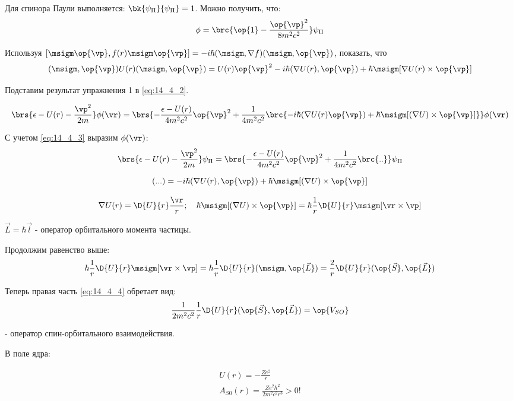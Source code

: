 Для спинора Паули выполняется: $\bk{\psi_\Pi}{\psi_\Pi} = 1$. Можно получить, что:
\begin{equation}
\label{eq:14_4_3}
\phi = \brc{\op{1} - \frac{\op{\vp}^2}{8m^2c^2}} \psi_\Pi
\end{equation}

\begin{excr}
Используя $[\msigm \op{\vp}, f(r) \msigm \op{\vp}] = -i\hbar (\msigm, \nabla f)(\msigm, \op{\vp})$, показать, что
$$
(\msigm, \op{\vp}) U(r) (\msigm, \op{\vp}) = U(r) \op{\vp}^2 - i \hbar (\nabla U(r), \op{\vp}) + \hbar \msigm [\nabla U(r) \times \op{\vp}]
$$
\end{excr}

Подставим результат упражнения 1 в \eqref{eq:14_4_2}.

$$
\brs{\epsilon - U(r) - \frac{{\vp}^2}{2m}}\phi(\vr) = \brs{- \frac{\epsilon - U(r)}{4m^2c^2}\op{\vp}^2 + \frac{1}{4m^2 c^2} \brc{-i\hbar (\nabla U(r) \op{\vp}) + \hbar \msigm [(\nabla U) \times \op{\vp}]}} \phi(\vr)
$$

С учетом \eqref{eq:14_4_3} выразим $\phi(\vr)$:
$$
\brs{\epsilon - U(r) - \frac{{\vp}^2}{2m}}\psi_\Pi = \brs{- \frac{\epsilon - U(r)}{4m^2c^2}\op{\vp}^2 + \frac{1}{4m^2 c^2} \brc{..}} \psi_\Pi
$$

\begin{equation}
\label{eq:14_4_4}
(...) = -i\hbar (\nabla U(r), \op{\vp}) + \hbar \msigm [(\nabla U) \times \op{\vp}]
\end{equation}

$$
\nabla U(r) = \D{U}{r} \frac{\vr}{r};~~~
\hbar \msigm [(\nabla U) \times \op{\vp}] = \hbar \frac{1}{r} \D{U}{r} \msigm [\vr \times \vp] 
$$

$\vec{L} = \hbar \vec{l}$ - оператор орбитального момента частицы.

Продолжим равенство выше:
$$
\hbar \frac{1}{r} \D{U}{r} \msigm [\vr \times \vp] = {\hbar} \frac{1}{r} \D{U}{r} (\msigm, \op{\vec{L}}) = \frac{2}{r} \D{U}{r} (\op{\vec{S}}, \op{\vec{L}})
$$

Теперь правая часть \eqref{eq:14_4_4} обретает вид: 
$$\frac{1}{2m^2c^2}\frac{1}{r} \D{U}{r} (\op{\vec{S}}, \op{\vec{L}}) = \op{V_{SO}}$$

- оператор спин-орбитального взаимодействия.

В поле ядра:

\begin{gather*}
U(r) = -\frac{Ze^2}{r} \\
\boxed{A_{S0} (r) = \frac{Ze^2 \hbar^2}{2m^2 c^2 r^3} > 0}!
\end{gather*}

